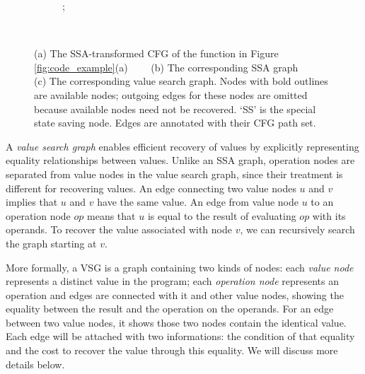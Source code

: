 \begin{figure}
\begin{subfigure}{0.5\textwidth}
{    ;
}{}{}
\end{subfigure}%
~
\begin{subfigure}{0.5\textwidth}
\end{subfigure}%

\caption{(a) The SSA-transformed CFG of the function in Figure \ref{fig:code_example}(a)$\quad\quad$ (b) The corresponding SSA graph $\quad\quad$ (c) The corresponding value search graph. Nodes with bold outlines are available nodes; outgoing edges for these nodes are omitted because available nodes need not be recovered. `SS' is the special state saving node. Edges are annotated with their CFG path set.}
\label{fig:VSG}
\end{figure}





A \emph{value search graph} enables efficient recovery of values by explicitly representing equality relationships between values. 
Unlike an SSA graph, operation nodes are separated from value nodes in the value search graph, since their treatment is different for recovering values.
An edge connecting two value nodes $u$ and $v$ implies that $u$ and $v$ have the same value. 
An edge from value node $u$ to an operation node $op$ means that  $u$ is equal to the result of evaluating $op$ with its operands. 
To recover the value associated with node $v$, we can recursively search the graph starting at $v$.  

More formally, a VSG is a graph containing two kinds of nodes: each \emph{value node} represents a distinct value in the program; each \emph{operation node} represents an operation and edges are connected with it and other value nodes, showing the equality between the result and the operation on the operands. 
For an edge between two value nodes, it shows those two nodes contain the identical value.
Each edge will be attached with two informations: the condition of that equality and the cost to recover the value through this equality. 
We will discuss more details below.

